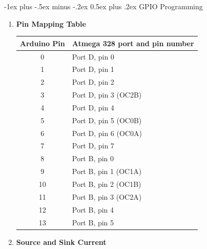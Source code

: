 \documentclass[10pt, landscape]{article}
\makeatletter
\renewcommand{\section}{\@startsection{section}{1}{0mm}%
                                {-1ex plus -.5ex minus -.2ex}%
                                {0.5ex plus .2ex}%
                                {\normalfont\large\bfseries}}
\makeatother
\begin{document}
\raggedright
\footnotesize
\begin{multicols}{4}


\setlength{\columnseprule}{0.25pt}
\setlength{\premulticols}{1pt}
\setlength{\postmulticols}{1pt}
\setlength{\multicolsep}{1pt}
\setlength{\columnsep}{2pt}

\begin{center}
\end{center}
\section{GPIO Programming}
\begin{enumerate}
    \item \textbf{Pin Mapping Table}
    \begin{tabular}{|c|l|}
    \hline
    \textbf{Arduino Pin} & \textbf{Atmega 328 port and pin number} \\
    \hline
    0 & Port D, pin 0 \\
    \hline
    1 & Port D, pin 1 \\
    \hline
    2 & Port D, pin 2 \\
    \hline
    3 & Port D, pin 3 (OC2B)\\
    \hline
    4 & Port D, pin 4 \\
    \hline
    5 & Port D, pin 5 (OC0B)\\
    \hline
    6 & Port D, pin 6 (OC0A)\\
    \hline
    7 & Port D, pin 7 \\
    \hline
    8 & Port B, pin 0 \\
    \hline
    9 & Port B, pin 1 (OC1A)\\
    \hline
    10 & Port B, pin 2 (OC1B)\\
    \hline
    11 & Port B, pin 3 (OC2A)\\
    \hline
    12 & Port B, pin 4 \\
    \hline
    13 & Port B, pin 5 \\
    \hline
    \end{tabular}
    \item \textbf{Source and Sink Current}

\end{enumerate}
\end{multicols}
\end{document}
